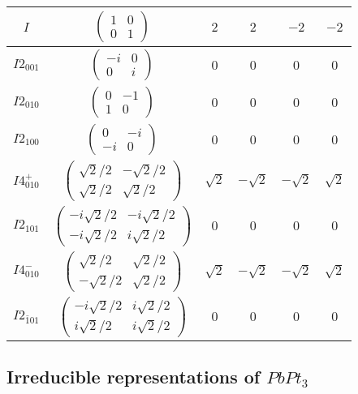 \documentclass[3p,preprint]{elsarticle}
\begin{document}
\begin{table}[H]
\begin{tabular}{|c|c||c|c|c|c|}
		$I$ & 				$\left(\begin{array}{cc} 1&0 \\ 0&1 \end{array}\right)$	& $2$ &  $2$ & $-2$ & $-2$ \\ \hline
		$I2_{001}$ &		$\left(\begin{array}{cc} -i&0 \\ 0&i \end{array}\right)$	& $0$ & $0$ & $0$ & $0$  \\ \hline
		$I2_{010}$ &		$\left(\begin{array}{cc} 0&-1 \\ 1&0 \end{array}\right)$	& $0$ & $0$ & $0$ & $0$  \\ \hline
		$I2_{100}$ &		$\left(\begin{array}{cc} 0&-i \\ -i&0 \end{array}\right)$	& $0$ & $0$ & $0$ & $0$  \\ \hline
		$I4^{+}_{010}$ &		$\left(\begin{array}{cc} \sqrt{2}/2&-\sqrt{2}/2 \\ \sqrt{2}/2&\sqrt{2}/2 \end{array}\right)$	& $\sqrt{2}$ & $-\sqrt{2}$ & $-\sqrt{2}$ & $\sqrt{2}$ \\ \hline
		$I2_{101}$ &		$\left(\begin{array}{cc} -i\sqrt{2}/2&-i\sqrt{2}/2 \\ -i\sqrt{2}/2&i\sqrt{2}/2 \end{array}\right)$	& $0$ & $0$ & $0$ & $0$  \\ \hline
		$I4^{-}_{010}$ &		$\left(\begin{array}{cc} \sqrt{2}/2&\sqrt{2}/2 \\ -\sqrt{2}/2&\sqrt{2}/2 \end{array}\right)$ & $\sqrt{2}$ & $-\sqrt{2}$ & $-\sqrt{2}$ & $\sqrt{2}$ \\ \hline
		$I2_{\bar{1}01}$ &		$\left(\begin{array}{cc} -i\sqrt{2}/2&i\sqrt{2}/2 \\ i\sqrt{2}/2&i\sqrt{2}/2 \end{array}\right)$	& $0$ & $0$ & $0$ & $0$  \\ \hline
		
		
	\end{tabular}
\end{table}

\subsection{Irreducible representations of $PbPt_3$}\label{app:b-pbpt3}
\end{document}
